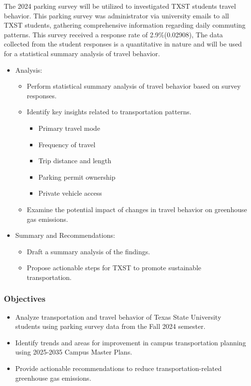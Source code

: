 \documentclass[
  letterpaper,
  DIV=11,
  numbers=noendperiod]{scrartcl}
\providecommand{\tightlist}{%
  \setlength{\itemsep}{0pt}\setlength{\parskip}{0pt}}
\begin{document}
The 2024 parking survey will be utilized to investigated TXST students
travel behavior. This parking survey was administrator via university
emails to all TXST students, gathering comprehensive information
regarding daily commuting patterns. This survey received a response rate
of 2.9\%(0.02908), The data collected from the student responses is a
quantitative in nature and will be used for a statistical summary
analysis of travel behavior.

\begin{itemize}
\tightlist
\item
  Analysis:

  \begin{itemize}
  \tightlist
  \item
    Perform statistical summary analysis of travel behavior based on
    survey responses.
  \item
    Identify key insights related to transportation patterns.

    \begin{itemize}
    \tightlist
    \item
      Primary travel mode
    \item
      Frequency of travel
    \item
      Trip distance and length
    \item
      Parking permit ownership
    \item
      Private vehicle access
    \end{itemize}
  \item
    Examine the potential impact of changes in travel behavior on
    greenhouse gas emissions.
  \end{itemize}
\item
  Summary and Recommendations:

  \begin{itemize}
  \tightlist
  \item
    Draft a summary analysis of the findings.
  \item
    Propose actionable steps for TXST to promote sustainable
    transportation.
  \end{itemize}
\end{itemize}

\subsubsection{Objectives}\label{objectives}

\begin{itemize}
\item
  Analyze transportation and travel behavior of Texas State University
  students using parking survey data from the Fall 2024 semester.
\item
  Identify trends and areas for improvement in campus transportation
  planning using 2025-2035 Campus Master Plans.
\item
  Provide actionable recommendations to reduce transportation-related
  greenhouse gas emissions.
\end{itemize}
\end{document}
